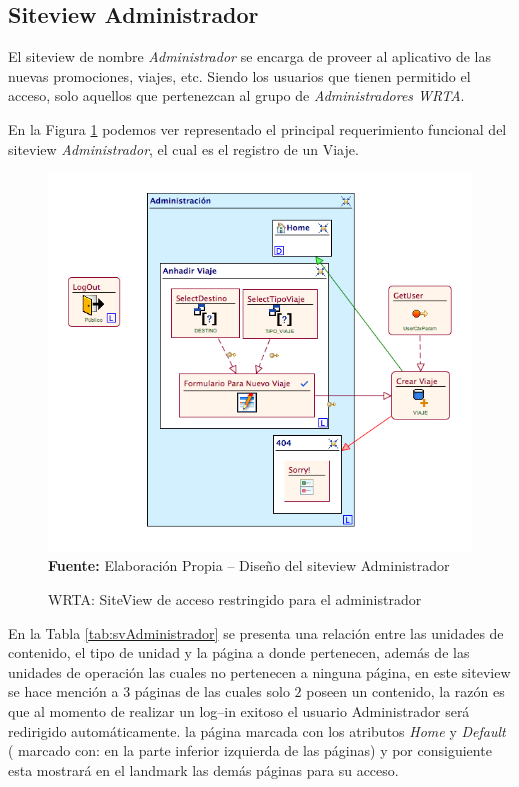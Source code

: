 \documentclass[oneside,12pt,a4paper]{memoir}%
\begin{document}
			
		\subsection{Siteview Administrador}
		\label{ssec:svAdministrador}
		
			El siteview de nombre \textit{Administrador} se encarga de proveer al
			aplicativo de las nuevas promociones, viajes, etc. Siendo los usuarios que
			tienen permitido el acceso, solo aquellos que pertenezcan al
			grupo de \textit{Administradores WRTA}.
			
			En la Figura \ref{fig:WRTA_svAdministrador} podemos ver representado el
			principal requerimiento funcional del siteview \textit{Administrador}, el cual
			es el registro de un Viaje.
	
			\begin{figure}[here]
				\centering
				\caption{WRTA: SiteView de acceso restringido para el administrador}
				\includegraphics[width=1.0\textwidth]{figure/fig_WRTA_svAdministrador.png}
				\newline
				\textbf{Fuente:} Elaboraci\'on Propia -- Dise\~no del siteview Administrador
				\label{fig:WRTA_svAdministrador}
			\end{figure}
			
			
		 	En la Tabla \ref{tab:svAdministrador} se presenta una relaci\'on entre las unidades
			de contenido, el tipo de unidad y la p\'agina a donde
			pertenecen, adem\'as de las unidades de operaci\'on las cuales no pertenecen
			a ninguna p\'agina, en este siteview se hace menci\'on a $3$ p\'aginas de
			las cuales solo $2$ poseen un contenido, la raz\'on es que al momento de
			realizar un log--in exitoso el usuario Administrador ser\'a redirigido
			autom\'aticamente. la p\'agina  marcada con los atributos \textit{Home} y
			\textit{Default} ( marcado con:  en la parte inferior izquierda de
			las p\'aginas) y por consiguiente esta mostrar\'a en el landmark las dem\'as
			p\'aginas para su acceso.
		 	 
\end{document}
